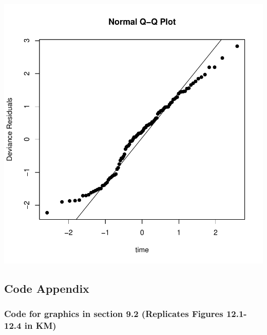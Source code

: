 \documentclass[10pt]{article}\usepackage[]{graphicx}\usepackage[]{xcolor}
\makeatletter
\def\maxwidth{ %
  \ifdim\Gin@nat@width>\linewidth
    \linewidth
  \else
    \Gin@nat@width
  \fi
}
\newenvironment{knitrout}{}{} %
\theoremstyle{definition}
\numberwithin{equation}{subsection}
\numberwithin{figure}{section}
\numberwithin{table}{subsection}
\numberwithin{Report}{section}
\numberwithin{Example}{subsection}
\makeatother
\begin{document}
\begin{knitrout}
\color{fgcolor}

{\centering \includegraphics[width=\maxwidth]{figure/unnamed-chunk-4-1} 

}


\end{knitrout}

\newpage

\subsection{Code Appendix}
\subsubsection{Code for graphics in section 9.2 (Replicates Figures 12.1-12.4 in KM)}
\end{document}
